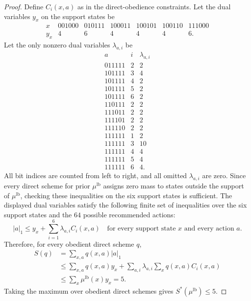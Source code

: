 \documentclass[10pt,a4paper]{amsart}
\begin{document}
\begin{proof}
Define $C_i(x,a)$ as in the direct-obedience constraints. Let the dual variables
$y_x$ on the support states be
\[
\begin{array}{c|cccccc}
x & 001000 & 010111 & 100011 & 100101 & 100110 & 111000\\
\hline
y_x & 4 & 6 & 4 & 4 & 4 & 6.
\end{array}
\]
Let the only nonzero dual variables $\lambda_{a,i}$ be
\[
\begin{array}{c|c|c}
a & i & \lambda_{a,i}\\
\hline
011111 & 2 & 2\\
101111 & 3 & 4\\
101111 & 4 & 2\\
101111 & 5 & 2\\
101111 & 6 & 2\\
110111 & 2 & 2\\
111011 & 2 & 2\\
111101 & 2 & 2\\
111110 & 2 & 2\\
111111 & 1 & 2\\
111111 & 3 & 10\\
111111 & 4 & 4\\
111111 & 5 & 4\\
111111 & 6 & 4.
\end{array}
\]
All bit indices are counted from left to right, and all omitted
$\lambda_{a,i}$ are zero. Since every direct scheme for prior $\mu^{\mathrm{lb}}$
assigns zero mass to states outside the support of $\mu^{\mathrm{lb}}$, checking
these inequalities on the six support states is sufficient. The displayed dual
variables satisfy the following finite set of inequalities over the six support
states and the $64$ possible recommended actions:
\[
|a|_1\leq y_x+\sum_{i=1}^6 \lambda_{a,i}C_i(x,a)
\quad\text{for every support state }x\text{ and every action }a.
\]
Therefore, for every obedient direct scheme $q$,
\[
\begin{aligned}
S(q)
&=\sum_{x,a} q(x,a)|a|_1\\
&\leq
\sum_{x,a}q(x,a)y_x
+\sum_{a,i}\lambda_{a,i}\sum_x q(x,a)C_i(x,a)\\
&\leq
\sum_x \mu^{\mathrm{lb}}(x)y_x
=5.
\end{aligned}
\]
Taking the maximum over obedient direct schemes gives
$S^*(\mu^{\mathrm{lb}})\leq 5$.
\end{proof}
\end{document}
